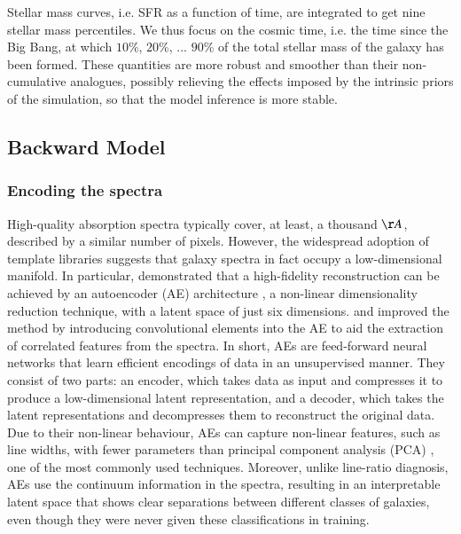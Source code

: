  Stellar mass curves, i.e. SFR as a function of time, are integrated to get nine stellar mass percentiles. We thus focus on the cosmic time,  i.e. the time since the Big Bang, at which $10$\%, $20$\%, ... $90$\%  of the total stellar mass of the galaxy has been formed. These quantities are more robust and smoother than their non-cumulative analogues, possibly relieving the effects imposed by the intrinsic priors of the simulation, so that the model inference is more stable. \\


\subsection{Backward Model}
\label{backward}
\subsubsection{Encoding the spectra}
\label{encoder}

High-quality absorption spectra typically cover, at least, a thousand $\AA$, described by a similar number of pixels. However, the widespread adoption of template libraries suggests that galaxy spectra in fact occupy a low-dimensional manifold. In particular, \cite{Portillo_2020} demonstrated that a high-fidelity reconstruction can be achieved by an autoencoder (AE) architecture  \citep{hinton}, a non-linear dimensionality reduction technique, with a latent space of just six dimensions. \cite{Teimoorinia_2022}  and  \cite{melchior2022} improved the method by introducing convolutional elements into the AE to aid the extraction of correlated features from the spectra. In short, AEs are feed-forward neural networks that learn efficient encodings of data in an unsupervised manner. They consist of two parts: an encoder, which takes data as input and compresses it to produce a low-dimensional latent representation, and a decoder, which takes the latent representations and decompresses them to reconstruct the original data. Due to their non-linear behaviour, AEs can capture non-linear features, such as line widths, with fewer parameters than principal component analysis (PCA) \citep{Yip_2004}, one of the most commonly used techniques. Moreover, unlike line-ratio diagnosis, AEs use the continuum information in the spectra, resulting in an interpretable latent space that shows clear separations between different classes of galaxies, even though they were never given these classifications in training.\\


